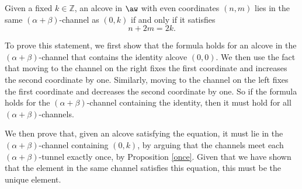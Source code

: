 \documentclass[11pt]{article}
\begin{document}
\begin{proposition} \label{alphaplusbeta}
    Given a fixed $k\in \mathbb{Z}$, an alcove in $\aw$ with even coordinates $(n,m)$ lies in the same $(\alpha+\beta)$-channel as $(0,k)$ if and only if it satisfies 
    \[n+2m=2k.\]
\end{proposition}
To prove this statement, we first show that the formula holds for an alcove in the $(\alpha+\beta)$-channel that contains the identity alcove $(0,0)$. We then use the fact that moving to the channel on the right fixes the first coordinate and increases the second coordinate by one. Similarly, moving to the channel on the left fixes the first coordinate and decreases the second coordinate by one. So if the formula holds for the $(\alpha+\beta)$-channel containing the identity, then it must hold for all $(\alpha+\beta)$-channels.

We then prove that, given an alcove satisfying the equation, it must lie in the $(\alpha+\beta)$-channel containing $(0,k)$, by arguing that the channels meet each $(\alpha+\beta)$-tunnel exactly once, by Proposition \ref{once}. Given that we have shown that the element in the same channel satisfies this equation, this must be the unique element. 
\end{document}
